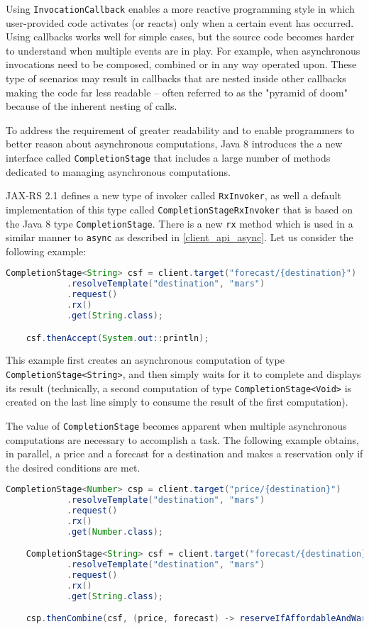 Using \lstinline{InvocationCallback} enables a more reactive programming style in which user-provided code activates (or
reacts) only when a certain event has occurred. Using callbacks works well for simple cases, but the source code becomes
harder to understand when multiple events are in play. For example, when asynchronous invocations need to be composed,
combined or in any way operated upon. These type of scenarios may result in callbacks that are nested inside other
callbacks making the code far less readable -- often referred to as the "pyramid of doom" because of the inherent
nesting of calls.

To address the requirement of greater readability and to enable programmers to better reason about asynchronous
computations, Java 8 introduces the a new interface called \lstinline{CompletionStage} that includes a large number of
methods dedicated to managing asynchronous computations.

JAX-RS 2.1 defines a new type of invoker called \lstinline{RxInvoker}, as well a default implementation of this type
called \lstinline{CompletionStageRxInvoker} that is based on the Java 8 type \lstinline{CompletionStage}. There is a
new \lstinline{rx} method which is used in a similar manner to \lstinline{async} as described in \ref{client_api_async}.
Let us consider the following example:

\begin{lstlisting}[language=Java]
    CompletionStage<String> csf = client.target("forecast/{destination}")
            .resolveTemplate("destination", "mars")
            .request()
            .rx()
            .get(String.class);

    csf.thenAccept(System.out::println);
\end{lstlisting}

This example first creates an asynchronous computation of type \lstinline{CompletionStage<String>}, and then simply
waits for it to complete and displays its result (technically, a second computation of type
\lstinline{CompletionStage<Void>} is created on the last line simply to consume the result of the first computation).

The value of \lstinline{CompletionStage} becomes apparent when multiple asynchronous computations are necessary to
accomplish a task. The following example obtains, in parallel, a price and a forecast for a destination and makes a
reservation only if the desired conditions are met.

\begin{lstlisting}[language=Java]
    CompletionStage<Number> csp = client.target("price/{destination}")
            .resolveTemplate("destination", "mars")
            .request()
            .rx()
            .get(Number.class);

    CompletionStage<String> csf = client.target("forecast/{destination}")
            .resolveTemplate("destination", "mars")
            .request()
            .rx()
            .get(String.class);

    csp.thenCombine(csf, (price, forecast) -> reserveIfAffordableAndWarm(price, forecast));
\end{lstlisting}

